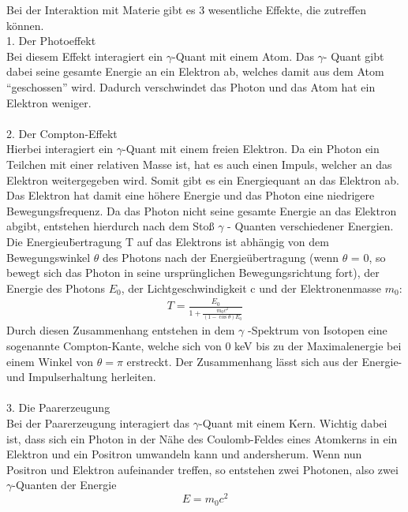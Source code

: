 \documentclass[11pt,a4paper]{article}
\begin{document}
Bei der Interaktion mit Materie gibt es 3 wesentliche Effekte, die zutreffen können.
  \\
  1. Der Photoeffekt \\
  Bei diesem Effekt interagiert ein $\gamma$-Quant mit einem Atom. Das $\gamma$-
  Quant gibt dabei seine gesamte Energie an ein Elektron ab, welches damit aus dem Atom
  ``geschossen'' wird. Dadurch verschwindet das Photon und das Atom hat ein Elektron
  weniger.
  \\\\
  2. Der Compton-Effekt \\
  Hierbei interagiert ein $\gamma$-Quant mit einem freien Elektron. Da ein Photon ein
  Teilchen mit einer relativen Masse ist, hat es auch einen Impuls, welcher an das
  Elektron weitergegeben wird. Somit gibt es ein Energiequant an das Elektron ab. Das
  Elektron hat damit eine höhere Energie und das Photon eine niedrigere
  Bewegungsfrequenz.
  Da das Photon nicht seine gesamte Energie an das Elektron abgibt, entstehen hierdurch nach dem Sto\ss 
  $\gamma$ - Quanten verschiedener Energien. Die Energieu\"bertragung T auf das Elektrons  ist abhängig von dem Bewegungswinkel $\theta$ des Photons nach der Energieübertragung (wenn $\theta$ = 0, so bewegt sich das Photon in seine urspr\"unglichen Bewegungsrichtung fort), der Energie des Photons $E_0$, der Lichtgeschwindigkeit c und der Elektronenmasse $m_0$:
  \begin{align}
      T=\frac{{E}_{0}}{1+\frac{{m}_{0}c^{2}}{(1-\cos\theta){E}_{0}}} \label{Streuformel}
  \end{align}
  Durch diesen Zusammenhang entstehen in dem $\gamma$ -Spektrum von Isotopen eine sogenannte Compton-Kante, 
  welche sich von 0 keV bis zu der Maximalenergie bei einem Winkel von $\theta = \pi$ erstreckt.
  Der Zusammenhang l\"asst sich aus der Energie- und Impulserhaltung herleiten.
  \\\\
  3. Die Paarerzeugung \\
  Bei der Paarerzeugung interagiert das $\gamma$-Quant mit einem Kern. Wichtig dabei
  ist, dass sich ein Photon in der Nähe des Coulomb-Feldes eines Atomkerns in ein
  Elektron und ein Positron umwandeln kann und andersherum. Wenn nun Positron und
  Elektron aufeinander treffen, so entstehen zwei Photonen, also zwei $\gamma$-Quanten der Energie
  \begin{equation}
  	E=m_0c^2 \label{Einstein}
  \end{equation}
  \\
\end{document}
